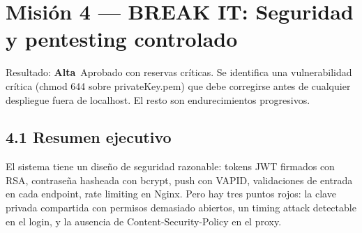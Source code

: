 \documentclass[10pt,a4paper]{article}
\newcommand{\badgeAlta}{\colorbox{orange!20}{\textcolor{orange!90!black}{\textbf{\footnotesize Alta}}}}
\begin{document}
\section{Misión 4 --- BREAK IT: Seguridad y pentesting controlado}
Resultado: \badgeAlta\  Aprobado con reservas críticas. Se identifica una vulnerabilidad crítica (chmod 644 sobre privateKey.pem) que debe corregirse antes de cualquier despliegue fuera de localhost. El resto son endurecimientos progresivos.\par\vspace{0.4em}
\subsection{4.1 Resumen ejecutivo}
El sistema tiene un diseño de seguridad razonable: tokens JWT firmados con RSA, contraseña hasheada con bcrypt, push con VAPID, validaciones de entrada en cada endpoint, rate limiting en Nginx. Pero hay tres puntos rojos: la clave privada compartida con permisos demasiado abiertos, un timing attack detectable en el login, y la ausencia de Content-Security-Policy en el proxy.\par\vspace{0.4em}
\end{document}
